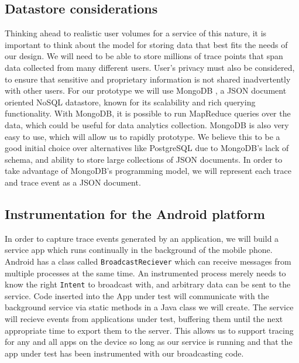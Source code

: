 \subsection{Datastore considerations}
Thinking ahead to realistic user volumes for a service of this nature, it is
important to think about the model for storing data that best fits the 
needs of our design. We will need to be able to store millions of trace points
that span data collected from many different users. User's privacy must also be
considered, to ensure that sensitive and proprietary information is not shared
inadvertently with other users. For our prototype we will use MongoDB \cite{MongoDB}, a 
JSON \cite{JSON} document oriented NoSQL datastore, known for its scalability and rich
querying functionality. With MongoDB, it is possible to run MapReduce \cite{MapReduce}
queries over the data, which could be useful for data analytics collection.
MongoDB is also very easy to use, which will allow us to rapidly prototype.
We believe this to be a good initial choice over alternatives like PostgreSQL \cite{Postgres}
due to MongoDB's lack of schema, and ability to store large collections of JSON documents. 
In order to take advantage of MongoDB's programming model, we will represent 
each trace and trace event as a JSON document.

\subsection{Instrumentation for the Android platform}
In order to capture trace events generated by an application, we will build
a service app which runs continually in the background of the mobile phone.
Android has a class called \texttt{BroadcastReciever} which can receive messages
from multiple processes at the same time. An instrumented process merely needs
to know the right \texttt{Intent} to broadcast with, and arbitrary data can be
sent to the service. Code inserted into the App under test will communicate with the
background service via static methods in a Java class we will create.
The service will recieve events from applications under test, buffering them until the
next appropriate time to export them to the server. This allows us to support 
tracing for any and all apps on the device so long as our service is running and 
that the app under test has been instrumented with our broadcasting code.

